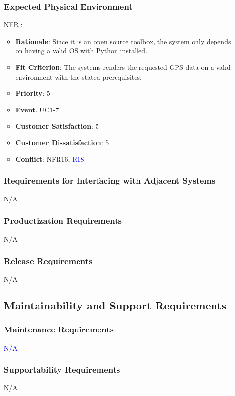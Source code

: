 \documentclass[12pt, titlepage]{article}
\newcounter{reqnum} %
\newcounter{freqnum} %
\begin{document}
\begin{itemize}
\subsubsection{Expected Physical Environment}
\item[NFR\refstepcounter{freqnum}\thefreqnum
\label{NFR}:] 
\begin{itemize}
    \item \textbf{Rationale}: Since it is an open source toolbox, the system only depends on having a valid OS with Python installed.
    \item \textbf{Fit Criterion}: The systems renders the requested GPS data on a valid environment with the stated prerequisites.
    \item \textbf{Priority}: 5
    \item \textbf{Event}: UC1-7%
    \item \textbf{Customer Satisfaction}: 5
    \item \textbf{Customer Dissatisfaction}: 5
    \item \textbf{Conflict}: NFR1\sout{6}, \textcolor{blue}{R18}
\end{itemize}
\subsubsection{Requirements for Interfacing with Adjacent Systems}
N/A
\subsubsection{Productization Requirements}
N/A
\subsubsection{Release Requirements}
N/A
\subsection{Maintainability and Support Requirements}

\subsubsection{Maintenance Requirements}
\textcolor{blue}{N/A}
\subsubsection{Supportability Requirements}
N/A

\end{itemize}
\end{document}
